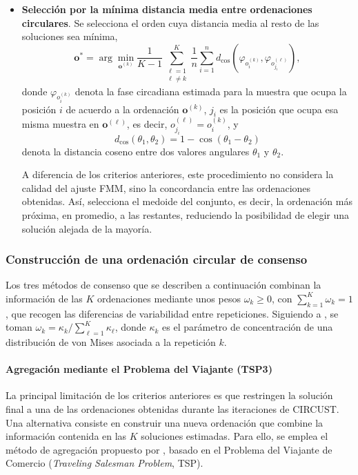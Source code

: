 \documentclass[12pt, a4paper]{report}
\begin{document}
\begin{itemize}
\item \textbf{Selección por la mínima distancia media entre ordenaciones circulares}. Se selecciona el orden cuya distancia media al resto de las soluciones sea mínima,
\[
\mathbf{o}^{*}
=
\arg\min_{\mathbf{o}^{(k)}}
\frac{1}{K-1}
\sum_{\substack{\ell=1\\ \ell\neq k}}^{K}
\frac{1}{n}
\sum_{i=1}^{n}
d_{\mathrm{cos}}
\!\left(
\varphi_{o^{(k)}_{i}},
\varphi_{o^{(\ell)}_{j_i}}
\right),
\]
donde \(\varphi_{o^{(k)}_{i}}\) denota la fase circadiana estimada para la muestra que ocupa la posición \(i\) de acuerdo a la ordenación \(\mathbf{o}^{(k)}\), \(j_i\) es la posición que ocupa esa misma muestra en \(\mathbf{o}^{(\ell)}\), es decir, \(o^{(\ell)}_{j_i}=o^{(k)}_{i}\), y
\[
d_{\mathrm{cos}}(\theta_1,\theta_2)=1-\cos(\theta_1-\theta_2)
\]
denota la distancia coseno entre dos valores angulares \(\theta_1\) y \(\theta_2\).

A diferencia de los criterios anteriores, este procedimiento no considera la calidad del ajuste FMM, sino la concordancia entre las ordenaciones obtenidas. Así, selecciona el medoide del conjunto, es decir, la ordenación más próxima, en promedio, a las restantes, reduciendo la posibilidad de elegir una solución alejada de la mayoría.

\end{itemize}
\subsubsection{Construcción de una ordenación circular de consenso}
\label{sec:consenso}

Los tres métodos de consenso que se describen a continuación combinan la información de las \(K\) ordenaciones mediante unos pesos \(\omega_k\geq0\), con \(\sum_{k=1}^{K}\omega_k=1\), que recogen las diferencias de variabilidad entre repeticiones. Siguiendo a \citet{barragan2015}, se toman \(\omega_k=\kappa_k/\sum_{\ell=1}^{K}\kappa_\ell\), donde \(\kappa_k\) es el parámetro de concentración de una distribución de von Mises asociada a la repetición \(k\).

\paragraph{Agregación mediante el Problema del Viajante (TSP3)}

La principal limitación de los criterios anteriores es que restringen la solución final a una de las ordenaciones obtenidas durante las iteraciones de CIRCUST. Una alternativa consiste en construir una nueva ordenación que combine la información contenida en las \(K\) soluciones estimadas. Para ello, se emplea el método de agregación propuesto por \citet{barragan2015}, basado en el Problema del Viajante de Comercio (\textit{Traveling Salesman Problem}, TSP). 
\end{document}
